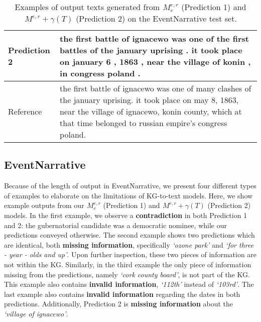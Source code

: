 \documentclass[11pt]{article}
\begin{document}
\begin{table*}[]
\begin{tabular}{l|p{13cm}}
Prediction 2 & the first battle of ignacewo was one of the first battles of the january uprising . it took place on january 6 , 1863 , near the village of konin , in congress poland . \\ \hline
Reference     & the first battle of ignacewo was one of many clashes of the january uprising. it took place on may 8, 1863, near the village of ignacewo, konin county, which at that time belonged to russian empire’s congress poland.                  \\ \midrule[2pt]
\end{tabular}\caption{\label{tab:ExamplesEvent} Examples of output texts generated from $ {}^{}_{}M^{e,r}_{e} $ (Prediction 1) and $ {}^{}_{}M^{e,r}_{} + \gamma(T)$ (Prediction 2) on the EventNarrative test set. }
\end{table*}




\subsection{EventNarrative}
Because of the length of output in EventNarrative, we present four different types of examples to elaborate on the limitations of KG-to-text models. Here, we show example outputs from our $ {}^{}_{}M^{e,r}_{e} $ (Prediction 1) and $ {}^{}_{}M^{e,r}_{} + \gamma(T)$ (Prediction 2) models. In the first example, we observe a \textbf{contradiction} in both Prediction 1 and 2: the gubernatorial candidate was a democratic nominee, while our predictions conveyed otherwise. The second example shows two predictions which are identical, both \textbf{missing information}, specifically \textit{`ozone park'} and \textit{`for three - year - olds and up'}. Upon further inspection, these two pieces of information are not within the KG. Similarly, in the third example the only piece of information missing from the predictions, namely \textit{`cork county board'}, is not part of the KG. This example also contains \textbf{invalid information}, \textit{`112th'} instead of \textit{`103rd'}. The last example also contains \textbf{invalid information} regarding the dates in both predictions. Additionally, Prediction 2 is \textbf{missing information} about the \textit{`village of ignacewo'}.
\end{document}
